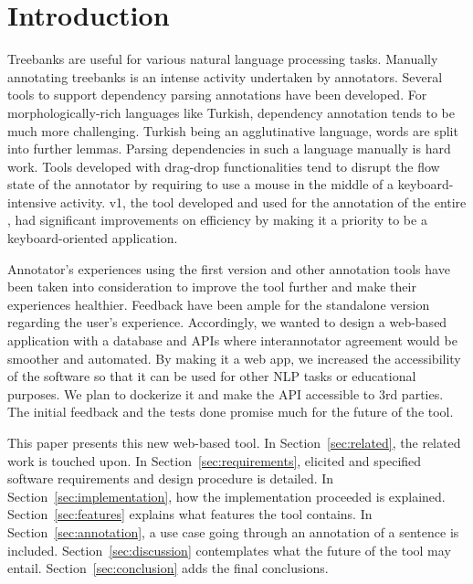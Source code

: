 \section{Introduction}
\label{sec:introduction}
Treebanks are useful for various natural language processing tasks.
Manually annotating treebanks is an intense activity undertaken by annotators.
Several tools to support dependency parsing annotations have been developed.\cite{brat}\cite{dgannotator}
For morphologically-rich languages like Turkish, dependency annotation tends to be much more challenging.
Turkish being an agglutinative language, words are split into further lemmas.
Parsing dependencies in such a language manually is hard work.
Tools developed with drag-drop functionalities tend to disrupt the flow state of the annotator by requiring to use a mouse in the middle of a keyboard-intensive activity.
\boat{} v1, the tool developed and used for the annotation of the entire \bountreebank{}, had significant improvements on efficiency by making it a priority to be a keyboard-oriented application.

Annotator's experiences using the first version and other annotation tools have been taken into consideration to improve the tool further and make their experiences healthier.
Feedback have been ample for the standalone version regarding the user's experience.
Accordingly, we wanted to design a web-based application with a database and APIs where interannotator agreement would be smoother and automated.
By making it a web app, we increased the accessibility of the software so that it can be used for other NLP tasks or educational purposes.
We plan to dockerize it and make the API accessible to 3rd parties.
The initial feedback and the tests done promise much for the future of the tool.

This paper presents this new web-based tool.
In Section~\ref{sec:related}, the related work is touched upon.
In Section~\ref{sec:requirements}, elicited and specified software requirements and design procedure is detailed.
In Section~\ref{sec:implementation}, how the implementation proceeded is explained.
Section~\ref{sec:features} explains what features the tool contains.
In Section~\ref{sec:annotation}, a use case going through an annotation of a sentence is included.
Section~\ref{sec:discussion} contemplates what the future of the tool may entail.
Section~\ref{sec:conclusion} adds the final conclusions.
